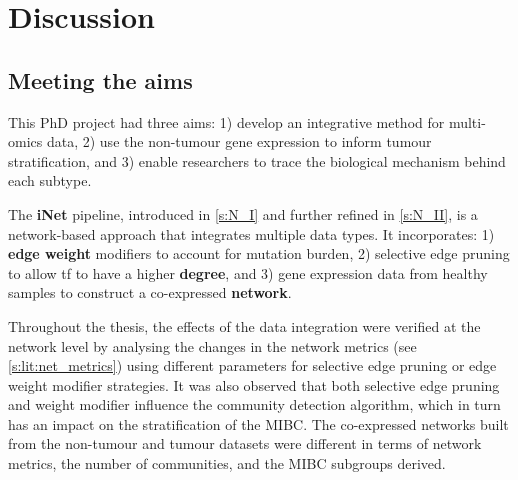 \chapter{Discussion} \label{s:discussion}

\vspace{3mm}
\vspace{3mm}


\section{Meeting the aims}

This PhD project had three aims: 1) develop an integrative method for multi-omics data, 2) use the non-tumour gene expression to inform tumour stratification, and 3) enable researchers to trace the biological mechanism behind each subtype.

The \textbf{iNet} pipeline, introduced in \cref{s:N_I} and further refined in \cref{s:N_II}, is a network-based approach that integrates multiple data types. It incorporates: 1) \textbf{edge weight} modifiers to account for mutation burden, 2) selective edge pruning to allow \acrlong{tf} to have a higher \textbf{degree}, and 3) gene expression data from healthy samples to construct a co-expressed \textbf{network}.

Throughout the thesis, the effects of the data integration were verified at the network level by analysing the changes in the network metrics (see \cref{s:lit:net_metrics}) using different parameters for selective edge pruning or edge weight modifier strategies. It was also observed that both selective edge pruning and weight modifier influence the community detection algorithm, which in turn has an impact on the stratification of the MIBC. The co-expressed networks built from the non-tumour and tumour datasets were different in terms of network metrics, the number of communities, and the MIBC subgroups derived.

